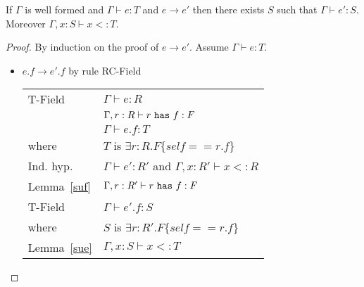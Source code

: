 \documentclass[preprint,nocopyrightspace,9pt]{sigplanconf}
\begin{document}
\begin{thm}
If $\Gamma$ is well formed and $\Gamma\vdash e:T$ and $e\rightarrow e'$ then there exists $S$ such that $\Gamma\vdash e':S$. Moreover $\Gamma,x:S\vdash x<:T$.
\end{thm}

\begin{proof}
By induction on the proof of $e\rightarrow e'$. Assume $\Gamma\vdash e:T$.

\begin{itemize}


\item $e.f \rightarrow e'.f$ by rule {\sc RC-Field}
\\
\begin{tabular}{ll}
{\sc T-Field} & $\Gamma\vdash e:R$
\\
& $\Gamma,r:R\vdash r~{\tt has}~f:F$
\\
& $\Gamma\vdash e.f:T$
\\
where & $T$ is $\exists r:R.F\{self==r.f\}$
\\
Ind. hyp. & $\Gamma\vdash e':R'$ and $\Gamma,x:R'\vdash x<:R$
\\
Lemma~\ref{suf} & $\Gamma,r:R'\vdash r~{\tt has}~f:F$
\\
{\sc T-Field} & $\Gamma\vdash e'.f:S$
\\
where & $S$ is $\exists r:R'.F\{self==r.f\}$
\\
Lemma~\ref{sue} & $\Gamma,x:S\vdash x<:T$
\end{tabular}



\end{itemize}
\end{proof}
\end{document}
